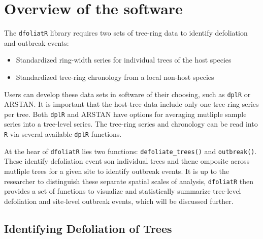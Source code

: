 \documentclass[review]{elsarticle} %
\providecommand{\tightlist}{%
  \setlength{\itemsep}{0pt}\setlength{\parskip}{0pt}}
\begin{document}
\hypertarget{overview-of-the-software}{%
\section{Overview of the software}\label{overview-of-the-software}}

The \texttt{dfoliatR} library requires two sets of tree-ring data to
identify defoliation and outbreak events:

\begin{itemize}
\tightlist
\item
  Standardized ring-width series for individual trees of the host
  species
\item
  Standardized tree-ring chronology from a local non-host species
\end{itemize}

Users can develop these data sets in software of their choosing, such as
\texttt{dplR} or ARSTAN. It is important that the host-tree data include
only one tree-ring series per tree. Both \texttt{dplR} and ARSTAN have
options for averaging mutliple sample series into a tree-level series.
The tree-ring series and chronology can be read into \texttt{R} via
several available \texttt{dplR} functions.

At the hear of \texttt{dfoliatR} lies two functions:
\texttt{defoliate\_trees()} and \texttt{outbreak()}. These identify
defoliation event son individual trees and thenc omposite across
mutliple trees for a given site to identify outbreak events. It is up to
the researcher to distinguish these separate spatial scales of analysis,
\texttt{dfoliatR} then provides a set of functions to visualize and
statistically summarize tree-level defoliation and site-level outbreak
events, which will be discussed further.

\hypertarget{identifying-defoliation-of-trees}{%
\subsection{Identifying Defoliation of
Trees}\label{identifying-defoliation-of-trees}}
\end{document}

